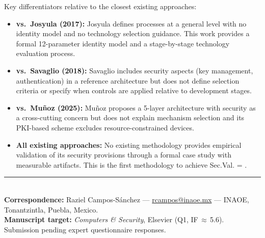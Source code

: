 \documentclass[12pt,a4paper]{article}
\newcommand{\cmark}{\ding{51}}
\newcommand{\yes}{\textcolor{checkgreen}{\cmark}}
\begin{document}
Key differentiators relative to the closest existing approaches:
\begin{itemize}[noitemsep]
  \item \textbf{vs.\ Josyula (2017):} Josyula defines processes at a general level with no identity model and no technology selection guidance. This work provides a formal 12-parameter identity model and a stage-by-stage technology evaluation process.
  \item \textbf{vs.\ Savaglio (2018):} Savaglio includes security aspects (key management, authentication) in a reference architecture but does not define selection criteria or specify when controls are applied relative to development stages.
  \item \textbf{vs.\ Muñoz (2025):} Muñoz proposes a 5-layer architecture with security as a cross-cutting concern but does not explain mechanism selection and its PKI-based scheme excludes resource-constrained devices.
  \item \textbf{All existing approaches:} No existing methodology provides empirical validation of its security provisions through a formal case study with measurable artifacts. This is the first methodology to achieve Sec.Val. = \yes.
\end{itemize}

\vfill
\noindent\rule{\textwidth}{0.4pt}\\[4pt]
{\small \textbf{Correspondence:} Raziel Campos-Sánchez --- \href{mailto:rcampos@inaoe.mx}{rcampos@inaoe.mx} --- INAOE, Tonantzintla, Puebla, Mexico.\\
\textbf{Manuscript target:} \textit{Computers \& Security}, Elsevier (Q1, IF\,$\approx$\,5.6). Submission pending expert questionnaire responses.}
\end{document}
